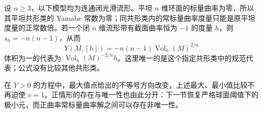 \begin{example}\label{g3:exm:yamabe-flat-negative-models}
	设 \(n\ge3\)，以下模型均为连通闭光滑流形。平坦 \(n\) 维环面的标量曲率为零，所以其平坦共形类的 Yamabe 常数为零；同共形类内的常标量曲率度量只能是原平坦度量的正常数倍。若一个闭 \(n\) 维流形带有截面曲率恒为 \(-1\) 的度量 \(h\)，则 \(s_h=-n(n-1)\)，从而
	\[
		Y(M,[h])=-n(n-1)\operatorname{Vol}_h(M)^{2/n}.
	\]
	体积为一的代表为 \(\operatorname{Vol}_h(M)^{-2/n}h\)。这里唯一的是这个指定共形类中的规范代表；公式没有比较其他共形类。
\end{example}

在 \(Y>0\) 的方程中，最大值点给出的不等号方向改变，上述最大、最小值比较不再迫使 \(v=1\)。正情形的存在与唯一性也由此分开：下一节恢复严格球面阈值下的极小元，而正曲率常标量曲率解之间可以存在非唯一性。
